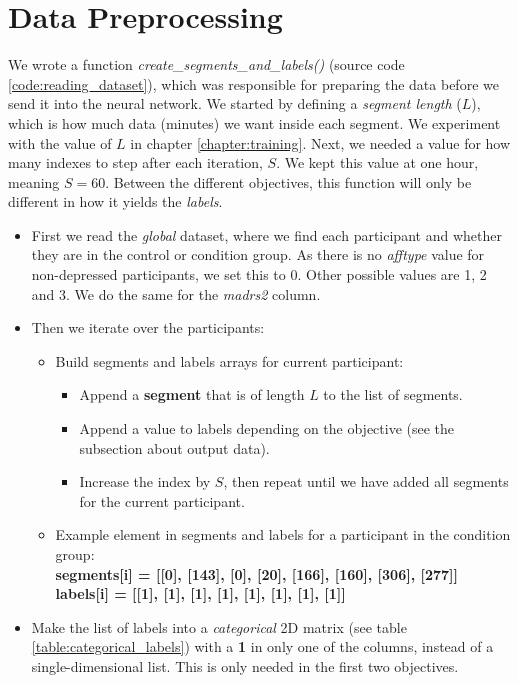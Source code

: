\section{Data Preprocessing}
\label{section:data_preprocessing}

We wrote a function \textit{create\_segments\_and\_labels()} (source code \ref{code:reading_dataset}), which was responsible for preparing the data before we send it into the neural network. We started by defining a \textit{segment length} ($L$), which is how much data (minutes) we want inside each segment. We experiment with the value of $L$ in chapter \ref{chapter:training}. Next, we needed a value for how many indexes to step after each iteration, $S$. We kept this value at one hour, meaning $S=60$. Between the different objectives, this function will only be different in how it yields the \textit{labels}.

\begin{itemize}
  \item First we read the \textit{global} dataset, where we find each participant and whether they are in the control or condition group. As there is no \textit{afftype} value for non-depressed participants, we set this to 0. Other possible values are 1, 2 and 3. We do the same for the \textit{madrs2} column.
  \item Then we iterate over the participants:

  \begin{itemize}
    \item Build segments and labels arrays for current participant:
    \begin{itemize}
      \item Append a \textbf{segment} that is of length $L$ to the list of segments. 
      \item Append a value to labels depending on the objective (see the subsection about output data).
      \item Increase the index by $S$, then repeat until we have added all segments for the current participant.
    \end{itemize}
    \item Example element in segments and labels for a participant in the condition group: \\
    \textbf{segments[i] = [[0], [143], [0], [20], [166], [160], [306], [277]]}\\
    \textbf{labels[i] = [[1], [1], [1], [1], [1], [1], [1], [1]]}
  \end{itemize}
  
  \item Make the list of labels into a \textit{categorical} 2D matrix (see table \ref{table:categorical_labels}) with a \textbf{1} in only one of the columns, instead of a single-dimensional list. This is only needed in the first two objectives.
\end{itemize}

